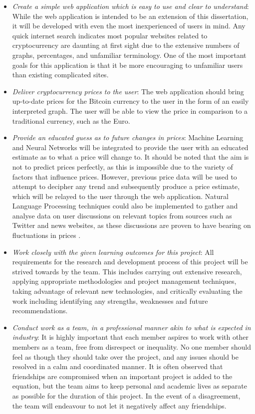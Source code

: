 \begin{itemize}
    \item \textit{Create a simple web application which is easy to use and clear to understand}: While the web application is intended to be an extension of this dissertation, it will be developed with even the most inexperienced of users in mind. Any quick internet search indicates most popular websites related to cryptocurrency are daunting at first sight due to the extensive numbers of graphs, percentages, and unfamiliar terminology. One of the most important goals for this application is that it be more encouraging to unfamiliar users than existing complicated sites.
    \item\textit{Deliver cryptocurrency prices to the user}: The web application should bring up-to-date prices for the Bitcoin currency to the user in the form of an easily interpreted graph. The user will be able to view the price in comparison to a traditional currency, such as the Euro.
    \item\textit{Provide an educated guess as to future changes in prices}: Machine Learning and Neural Networks will be integrated to provide the user with an educated estimate as to what a price will change to. It should be noted that the aim is not to predict prices perfectly, as this is impossible due to the variety of factors that influence prices. However, previous price data will be used to attempt to decipher any trend and subsequently produce a price estimate, which will be relayed to the user through the web application. Natural Language Processing techniques could also be implemented to gather and analyse data on user discussions on relevant topics from sources such as Twitter and news websites, as these discussions are proven to have bearing on fluctuations in prices \cite{socmedimpact}.
    \item\textit{Work closely with the given learning outcomes for this project}: All requirements for the research and development process of this project will be strived towards by the team. This includes carrying out extensive research, applying appropriate methodologies and project management techniques, taking advantage of relevant new technologies, and critically evaluating the work including identifying any strengths, weaknesses and future recommendations.
    \item\textit{Conduct work as a team, in a professional manner akin to what is expected in industry}: It is highly important that each member aspires to work with other members as a team, free from disrespect or inequality. No one member should feel as though they should take over the project, and any issues should be resolved in a calm and coordinated manner. It is often observed that friendships are compromised when an important project is added to the equation, but the team aims to keep personal and academic lives as separate as possible for the duration of this project. In the event of a disagreement, the team will endeavour to not let it negatively affect any friendships.
\end{itemize}

